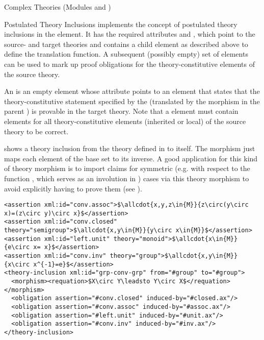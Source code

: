 \begin{tchapter}[id=complex-theories,short=Complex Theories]{Complex Theories (Modules
    {} and {})}
\begin{tsection}[id=theory-inclusions]{Postulated Theory Inclusions}
  {\omdoc} implements the concept of postulated theory inclusions in the
  {} {} element. It has the required
  attributes {} and {},
  which point to the source- and target theories and contains a {} child
  element as described above to define the translation function. A subsequent (possibly
  empty) set of {} elements can be used to mark up proof obligations
  for the theory-constitutive elements of the source theory.

  An {} is an empty element whose {}
  attribute points to an {} element that states that the
  theory-constitutive statement specified by the {}
  (translated by the morphism in the parent {}) is provable in
  the target theory. Note that a {} element must contain
  {} elements for all theory-constitutive elements (inherited or
  local) of the source theory to be correct.

{} shows a theory inclusion from the theory
{} defined in {} to itself. The morphism just
maps each element of the base set to its inverse. A good application for this kind
of theory morphism is to import claims for symmetric (e.g. with respect to the
function {}, which serves as an involution in {})
cases via this theory morphism to avoid explicitly having to prove them (see
{}).

\begin{lstlisting}[label=lst:theory-inclusion,mathescape,
  caption={A Theory Inclusion for Groups},
  index={theory-inclusion,morphism,requation,assertion}]
<assertion xml:id="conv.assoc">$\allcdot{x,y,z\in{M}}{z\circ(y\circ x)=(z\circ y)\circ x}$</assertion>
<assertion xml:id="conv.closed" theory="semigroup">$\allcdot{x,y\in{M}}{y\circ x\in{M}}$</assertion>
<assertion xml:id="left.unit" theory="monoid">$\allcdot{x\in{M}}{e\circ x= x}$</assertion>
<assertion xml:id="conv.inv" theory="group">$\allcdot{x,y\in{M}}{x\circ x^{-1}=e}$</assertion>
<theory-inclusion xml:id="grp-conv-grp" from="#group" to="#group">
  <morphism><requation>$X\circ Y\leadsto Y\circ X$</requation></morphism>
  <obligation assertion="#conv.closed" induced-by="#closed.ax"/>
  <obligation assertion="#conv.assoc" induced-by="#assoc.ax"/>
  <obligation assertion="#left.unit" induced-by="#unit.ax"/>
  <obligation assertion="#conv.inv" induced-by="#inv.ax"/>
</theory-inclusion>  
\end{lstlisting}
\end{tsection}


\end{tchapter}
